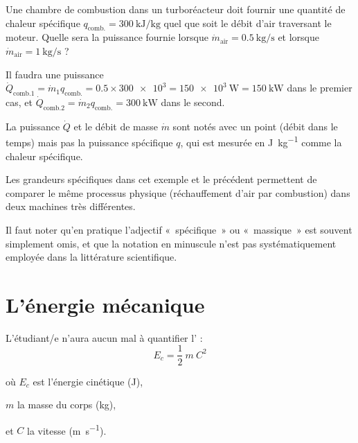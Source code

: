 \begin{description}
			\begin{anexample}
				Une chambre de combustion dans un turboréacteur doit fournir une quantité de chaleur spécifique $q_{\text{comb.}} = \SI{300}{\kilo\joule\per\kilogram}$ quel que soit le débit d’air traversant le moteur. Quelle sera la puissance fournie lorsque $\dot{m}_\text{air} = \SI{0,5}{\kilogram\per\second}$ et lorsque $\dot{m}_\text{air} = \SI{1}{\kilogram\per\second}$ ?
		
				\begin{answer}Il faudra une puissance $\dot{Q}_{\text{comb.}1} = \dot{m}_1 q_{\text{comb.}} = \num{0,5} \times \num{300e3} = \SI{150e3}{\watt} = \SI{150}{\kilo\watt}$ dans le premier cas, et $\dot{Q}_{\text{comb.}2} = \dot{m}_2 q_{\text{comb.}} = \SI{300}{\kilo\watt}$ dans le second.
					\begin{remark}La puissance $\dot{Q}$ et le débit de masse $\dot{m}$ sont notés avec un point (débit dans le temps) mais pas la puissance spécifique $q$, qui est mesurée en \si{\joule\per\kilogram} comme la chaleur spécifique.\end{remark}
					\begin{remark}Les grandeurs spécifiques dans cet exemple et le précédent permettent de comparer le même processus physique (réchauffement d’air par combustion) dans deux machines très différentes.\end{remark}
				\end{answer}
			\end{anexample}
		
		\end{description}

		Il faut noter qu’en pratique l’adjectif «~spécifique~» ou «~massique~» est souvent simplement omis, et que la notation en minuscule n’est pas systématiquement employée dans la littérature scientifique.


\onlyframabook{\clearpage}%
\section{L’énergie mécanique}
\label{ch_energie_mecanique}

	L’étudiant/e n’aura aucun mal à quantifier l’ :
	\begin{equation}
	E_{c} = \frac{1}{2} \ m \ C^2
	\label{eq_énergie_cinétique}
	\end{equation}
	\begin{equationterms}
		\item où \tab $E_{c}$ 	\tab est l’énergie cinétique (\si{\joule}),
		\item 	\tab $m$ 		\tab la masse du corps (\si{\kilogram}),
		\item et	\tab $C$			\tab la vitesse (\si{\metre\per\second}).
	\end{equationterms}

